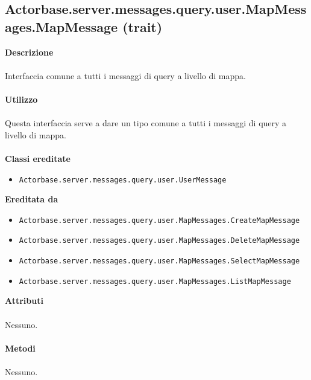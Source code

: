 \documentclass[a4paper]{article}
\begin{document}
	\subsection{Actorbase.server.messages.query.user.MapMessages.MapMessage (trait)}
		\textbf{Descrizione}
			\\ \\
		Interfaccia comune a tutti i messaggi di query a livello di mappa.
			\\ \\
		\textbf{Utilizzo}
			\\ \\
		Questa interfaccia serve a dare un tipo comune a tutti i messaggi di query a livello di mappa.
			\\ \\
		\textbf{Classi ereditate}
			\begin{itemize}
				\item \texttt{Actorbase.server.messages.query.user.UserMessage }
			\end{itemize}
		\textbf{Ereditata da}
			\begin{itemize}
				\item \texttt{Actorbase.server.messages.query.user.MapMessages.CreateMapMessage }
				\item \texttt{Actorbase.server.messages.query.user.MapMessages.DeleteMapMessage }
				\item \texttt{Actorbase.server.messages.query.user.MapMessages.SelectMapMessage }
				\item \texttt{Actorbase.server.messages.query.user.MapMessages.ListMapMessage }
			\end{itemize}
		\textbf{Attributi}
			\\ \\
			Nessuno.
			\\ \\
		\textbf{Metodi}
			\\ \\
			Nessuno.	
			
\end{document}
